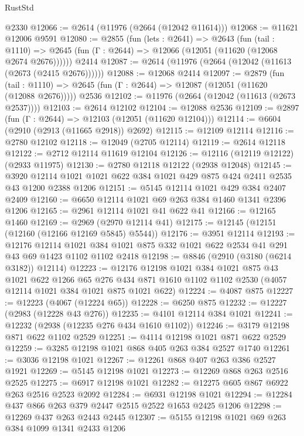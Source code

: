 \begin{lexlean}{RustStd}
\begin{coremodule}
    @2330
@12066 := @2614 (@11976 (@2664 (@12042 @11614)))
@12068 := @11621 @12006 @9591
@12080 := @2855
    (fun (lets : @2641) =>
    @2643
      (fun (tail : @1110) =>
      @2645 (fun (Γ : @2644) => @12066 (@12051 (@11620 (@12068 @2674 @2676))))))
    @2414
@12087 := @2614 (@11976 (@2664 (@12042 (@11613 (@2673 (@2415 @2676))))))
@12088 := @12068 @2414
@12097 := @2879
    (fun (tail : @1110) => @2645 (fun (Γ : @2644) => @12087 (@12051 (@11620 (@12088 @2676)))))
    @2536
@12102 := @11976 (@2664 (@12042 (@11613 (@2673 @2537))))
@12103 := @2614 @12102
@12104 := @12088 @2536
@12109 := @2897 (fun (Γ : @2644) => @12103 (@12051 (@11620 @12104)))
@12114 := @6604 (@2910 (@2913 (@11665 @2918)) @2692)
@12115 := @12109 @12114
@12116 := @2780 @12102
@12118 := @12049 (@2705 @12114)
@12119 := @2614 @12118
@12122 := @2712 @12114 @11619 @12104
@12126 := @12116 (@12119 @12122) (@2933 @11975)
@12130 := @2780 @12118 @12122 (@2938 @12048)
@12145 := @3920 @12114 @1021 @1021 @622 @384 @1021 @429 @875 @424 @2411 @2535 @43 @1200 @2388 @1206
@12151 := @5145 @12114 @1021 @429 @384 @2407 @2409
@12160 := @6650 @12114 @1021 @69 @263 @384 @1460 @1341 @2396 @1206
@12165 := @2961 @12114 @1021 @41 @622 @41
@12166 := @12165 @1460
@12169 := @2969 (@2970 @12114 @41)
@12175 := @12145 (@12151 (@12160 (@12166 @12169 @5845) @5544))
@12176 := @3951 @12114
@12193 := @12176
    @12114
    @1021
    @384
    @1021
    @875
    @332
    @1021
    @622
    @2534
    @41
    @291
    @43
    @69
    @1423
    @1102
    @1102
    @2418
@12198 := @8846 (@2910 (@3180 (@6214 @3182)) @12114)
@12223 := @12176
    @12198
    @1021
    @384
    @1021
    @875
    @43
    @1021
    @622
    @1266
    @65
    @276
    @434
    @871
    @1610
    @1102
    @1102
    @2530
    (@4057 @12114 @1021 @384 @1021 @875 @1021 @622)
@12224 := @4087 @875
@12227 := @12223 (@4067 (@12224 @65))
@12228 := @6250 @875
@12232 := @12227 (@2983 (@12228 @43 @276))
@12235 := @4101 @12114 @384 @1021
@12241 := @12232 (@2938 (@12235 @276 @434 @1610 @1102))
@12246 := @3179 @12198 @871 @622 @1102 @2529
@12251 := @4114 @12198 @1021 @871 @622 @2529
@12259 := @3285 @12198 @1021 @868 @405 @263 @384 @2527 @1740
@12261 := @3036 @12198 @1021
@12267 := @12261 @868 @407 @263 @386 @2527 @1921
@12269 := @5145 @12198 @1021
@12273 := @12269 @868 @263 @2516 @2525
@12275 := @6917 @12198 @1021
@12282 := @12275 @605 @867 @6922 @263 @2516 @2523 @2092
@12284 := @6931 @12198 @1021
@12294 := @12284 @437 @866 @263 @379 @2447 @2515 @2522 @1653 @2425 @1206
@12298 := @12269 @437 @263 @2443 @2445
@12307 := @5155 @12198 @1021 @69 @263 @384 @1099 @1341 @2433 @1206

\end{coremodule}
\end{lexlean}
